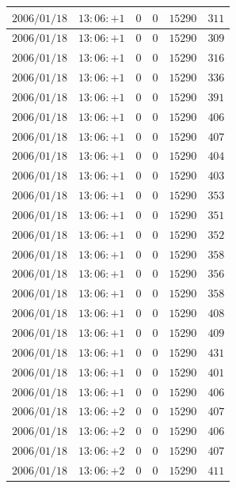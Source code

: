 \documentclass[a4j,papersize,disablejfam,slide,14pt]{jsarticle}
\begin{document}
\begin{description}
\begin{center}
\begin{longtable}{|l|l|l|l|l|l|}
					$2006/01/18$ & $13:06:+1$  & $0$ & $0$ & $15290$ & $311$ \\ \hline
					$2006/01/18$ & $13:06:+1$  & $0$ & $0$ & $15290$ & $309$ \\ \hline
					$2006/01/18$ & $13:06:+1$  & $0$ & $0$ & $15290$ & $316$ \\ \hline
					$2006/01/18$ & $13:06:+1$  & $0$ & $0$ & $15290$ & $336$ \\ \hline
					$2006/01/18$ & $13:06:+1$  & $0$ & $0$ & $15290$ & $391$ \\ \hline
					$2006/01/18$ & $13:06:+1$  & $0$ & $0$ & $15290$ & $406$ \\ \hline
					$2006/01/18$ & $13:06:+1$  & $0$ & $0$ & $15290$ & $407$ \\ \hline
					$2006/01/18$ & $13:06:+1$  & $0$ & $0$ & $15290$ & $404$ \\ \hline
					$2006/01/18$ & $13:06:+1$  & $0$ & $0$ & $15290$ & $403$ \\ \hline
					$2006/01/18$ & $13:06:+1$  & $0$ & $0$ & $15290$ & $353$ \\ \hline
					$2006/01/18$ & $13:06:+1$  & $0$ & $0$ & $15290$ & $351$ \\ \hline
					$2006/01/18$ & $13:06:+1$  & $0$ & $0$ & $15290$ & $352$ \\ \hline
					$2006/01/18$ & $13:06:+1$  & $0$ & $0$ & $15290$ & $358$ \\ \hline
					$2006/01/18$ & $13:06:+1$  & $0$ & $0$ & $15290$ & $356$ \\ \hline
					$2006/01/18$ & $13:06:+1$  & $0$ & $0$ & $15290$ & $358$ \\ \hline
					$2006/01/18$ & $13:06:+1$  & $0$ & $0$ & $15290$ & $408$ \\ \hline
					$2006/01/18$ & $13:06:+1$  & $0$ & $0$ & $15290$ & $409$ \\ \hline
					$2006/01/18$ & $13:06:+1$  & $0$ & $0$ & $15290$ & $431$ \\ \hline
					$2006/01/18$ & $13:06:+1$  & $0$ & $0$ & $15290$ & $401$ \\ \hline
					$2006/01/18$ & $13:06:+1$  & $0$ & $0$ & $15290$ & $406$ \\ \hline
					$2006/01/18$ & $13:06:+2$  & $0$ & $0$ & $15290$ & $407$ \\ \hline
					$2006/01/18$ & $13:06:+2$  & $0$ & $0$ & $15290$ & $406$ \\ \hline
					$2006/01/18$ & $13:06:+2$  & $0$ & $0$ & $15290$ & $407$ \\ \hline
					$2006/01/18$ & $13:06:+2$  & $0$ & $0$ & $15290$ & $411$ \\ \hline

\end{longtable}
\end{center}
\end{description}
\end{document}
